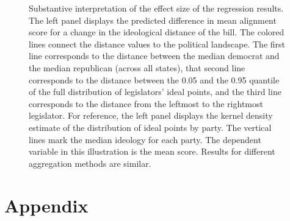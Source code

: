 \documentclass[12pt]{article} %
\begin{document}
\begin{figure}[H]%
\centering
{}
\caption{Substantive interpretation of the effect size of the regression results. The left panel displays the predicted difference in mean alignment score for a change in the ideological distance of the bill. The colored lines connect the distance values to the political landscape. The first line corresponds to the distance between the median democrat and the median republican (across all states), that second line corresponds to the distance between the 0.05 and the 0.95 quantile of the full distribution of legislators' ideal points, and the third line corresponds to the distance from the leftmost to the rightmost legislator. For reference, the left panel displays the kernel density estimate of the distribution of ideal points by party. The vertical lines mark the median ideology for each party. The dependent variable in this illustration is the mean score. Results for different aggregation methods are similar. }
\label{fig:ideo_interpret}
\end{figure}



\clearpage





\section{Appendix}
\end{document}
